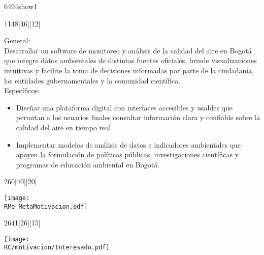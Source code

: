 \begin{NuevaPagina}{64}{94}{show1}
\begin{NuevoParrafo}{11}{48}[46][12]
		\begin{Marco}[\LineaSupC][\LineaInfC][\LineaIzqC][\LineaDerC][CBlanco]
			\begin{Objetivos}[Objetivos]
				{	{\large General:}\vspace{5pt}\\
					{\linespread{.8}\selectfont Desarrollar un software de monitoreo y análisis de la calidad del aire en Bogotá que integre datos ambientales de distintas fuentes oficiales, brinde visualizaciones intuitivas y facilite la toma de decisiones informadas por parte de la ciudadanía, las entidades gubernamentales y la comunidad científica.}\\[0.3cm]
					{\large Específicos:}
					{\begin{itemize}
							\setlength{\itemsep}{-0.5pt}
							\setlength{\parskip}{0pt}
							\setlength{\parsep}{0pt}
							\item Diseñar una plataforma digital con interfaces accesibles y usables que permitan a los usuarios finales consultar información clara y confiable sobre la calidad del aire en tiempo real.
							\item Implementar modelos de análisis de datos e indicadores ambientales que apoyen la formulación de políticas públicas, investigaciones científicas y programas de educación ambiental en Bogotá.
					\end{itemize}}
				}
			\end{Objetivos}
		\end{Marco}
	\end{NuevoParrafo}
	
	\begin{NuevoParrafo}{26}{0}[40][20]
		\begin{Marco}[\LineaSupC][\LineaInfC][\LineaIzqC][\LineaDerC][CBlanco]
			\centering\texttt{[image: \\RMe MetaMotivacion.pdf]}
		\end{Marco}
	\end{NuevoParrafo}
	
	\begin{NuevoParrafo}{26}{41}[26][15]
		\begin{Marco}[\LineaSupC][\LineaInfC][\LineaIzqC][\LineaDerC][CBlanco]
		\subseccionC{\PVSta}%
		\centering\texttt{[image: \\RC/motivacion/Interesado.pdf]}
		\end{Marco}
	\end{NuevoParrafo}
	

\end{NuevaPagina}
